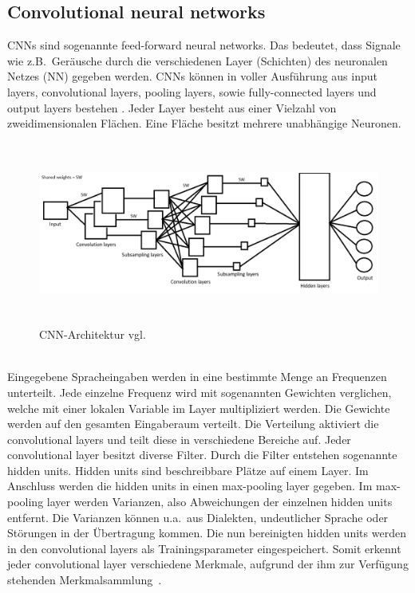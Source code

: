 \subsection{Convolutional neural networks}
CNNs sind sogenannte feed-forward neural networks. Das bedeutet, dass Signale wie z.B.~Geräusche durch die verschiedenen Layer (Schichten) des neuronalen Netzes (NN) gegeben werden. CNNs können in voller Ausführung aus input layers, convolutional layers, pooling layers, sowie fully-connected layers und output layers bestehen \cite{facialemotionrecusingcnn}. Jeder Layer besteht aus einer Vielzahl von zweidimensionalen Flächen. Eine Fläche besitzt mehrere unabhängige Neuronen.
\\
\begin{figure}[h]
\includegraphics[width=\linewidth, height=6cm]{Bilder/CNN/CNNArchitektur.png}
\caption{CNN-Architektur vgl. \cite{noisycnn}}
\end{figure}
\\
Eingegebene Spracheingaben werden in eine bestimmte Menge an Frequenzen unterteilt. Jede einzelne Frequenz wird mit sogenannten Gewichten verglichen, welche mit einer lokalen Variable im Layer multipliziert werden. Die Gewichte werden auf den gesamten Eingaberaum verteilt. Die Verteilung aktiviert die convolutional layers und teilt diese in verschiedene Bereiche auf. Jeder convolutional layer besitzt diverse Filter. Durch die Filter entstehen sogenannte hidden units. Hidden units sind beschreibbare Plätze auf einem Layer. Im Anschluss werden die hidden units in einen max-pooling layer gegeben. Im max-pooling layer werden Varianzen, also Abweichungen der einzelnen hidden units entfernt. Die Varianzen können u.a.~aus Dialekten, undeutlicher Sprache oder Störungen in der Übertragung kommen. Die nun bereinigten hidden units werden in den convolutional layers als Trainingsparameter eingespeichert. Somit erkennt jeder convolutional layer verschiedene Merkmale, aufgrund der ihm zur Verfügung stehenden Merkmalsammlung~\cite{usingcnn}.